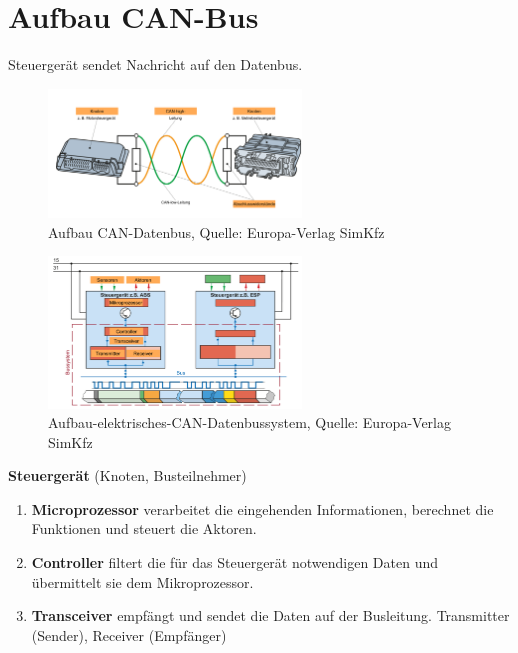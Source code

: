 \section{Aufbau CAN-Bus}\label{aufbau-can-bus}

Steuergerät sendet Nachricht auf den Datenbus.

\begin{figure}[!ht]%
\centering
\includegraphics[width=0.6\textwidth]{images/CAN/Aufbau-CAN-Datenbus.png}
\caption{Aufbau CAN-Datenbus, Quelle: Europa-Verlag SimKfz}
\end{figure}

\begin{figure}[!ht]%
\centering
\includegraphics[width=0.6\textwidth]{images/CAN/Aufbau-elektrisches-CAN-Datenbussystem.png}
\caption{Aufbau-elektrisches-CAN-Datenbussystem, Quelle: Europa-Verlag
SimKfz}
\end{figure}

\textbf{Steuergerät} (Knoten, Busteilnehmer)

\begin{enumerate}
\item
  \textbf{Microprozessor} verarbeitet die eingehenden Informationen,
  berechnet die Funktionen und steuert die Aktoren.
\item
  \textbf{Controller} filtert die für das Steuergerät notwendigen Daten
  und übermittelt sie dem Mikroprozessor.
\item
  \textbf{Transceiver} empfängt und sendet die Daten auf der Busleitung.
  Transmitter (Sender), Receiver (Empfänger)
\end{enumerate}

